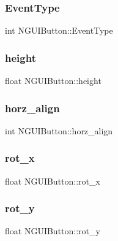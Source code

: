 \subsubsection{\texorpdfstring{Event\+Type}{EventType}}
{\footnotesize\ttfamily int N\+G\+U\+I\+Button\+::\+Event\+Type}

\hypertarget{class_n_g_u_i_button_aefc276c1c928bc98f9db9634620e5053}{}\label{class_n_g_u_i_button_aefc276c1c928bc98f9db9634620e5053} 
\subsubsection{\texorpdfstring{height}{height}}
{\footnotesize\ttfamily float N\+G\+U\+I\+Button\+::height}

\hypertarget{class_n_g_u_i_button_a17117daf4fa576cbef7224ee11fb573c}{}\label{class_n_g_u_i_button_a17117daf4fa576cbef7224ee11fb573c} 
\subsubsection{\texorpdfstring{horz\+\_\+align}{horz\_align}}
{\footnotesize\ttfamily int N\+G\+U\+I\+Button\+::horz\+\_\+align}

\hypertarget{class_n_g_u_i_button_a0079ad483cdf4b973f2d82954b51f50e}{}\label{class_n_g_u_i_button_a0079ad483cdf4b973f2d82954b51f50e} 
\subsubsection{\texorpdfstring{rot\+\_\+x}{rot\_x}}
{\footnotesize\ttfamily float N\+G\+U\+I\+Button\+::rot\+\_\+x}

\hypertarget{class_n_g_u_i_button_a069a76161bdb15b5ed36c9c76517d342}{}\label{class_n_g_u_i_button_a069a76161bdb15b5ed36c9c76517d342} 
\subsubsection{\texorpdfstring{rot\+\_\+y}{rot\_y}}
{\footnotesize\ttfamily float N\+G\+U\+I\+Button\+::rot\+\_\+y}

